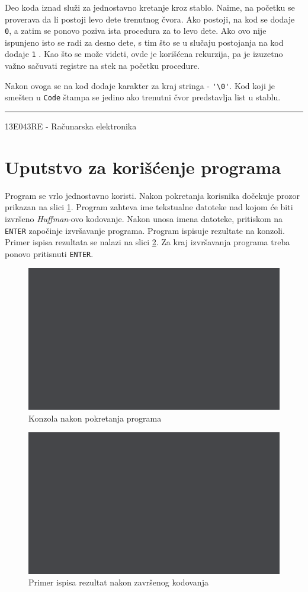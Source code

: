 \documentclass[a4paper, 12pt]{article}
\newcommand{\btmline}{
\vfill
\rule{0.9\textwidth}{0.4mm}
\begin{center}
13E043RE - Računarska elektronika
\end{center}}
\begin{document}
Deo koda iznad služi za jednostavno kretanje kroz stablo. Naime, na početku se proverava da li postoji levo dete trenutnog čvora. Ako postoji, na kod se dodaje \verb|0|, a zatim se ponovo poziva ista procedura za to levo dete. Ako ovo nije ispunjeno isto se radi za desno dete, s tim što se u slučaju postojanja na kod dodaje \verb|1| . Kao što se može videti, ovde je korišćena rekurzija, pa je izuzetno važno sačuvati registre na stek na početku procedure.

\vspace{2cm}

Nakon ovoga se na kod dodaje karakter za kraj stringa - \verb|'\0'|. Kod koji je smešten u \verb|Code| štampa se jedino ako trenutni čvor predstavlja list u stablu.

\btmline\newpage

\section*{Uputstvo za korišćenje programa}

Program se vrlo jednostavno koristi. Nakon pokretanja korisnika dočekuje prozor prikazan na slici \ref{startup}. Program zahteva ime tekstualne datoteke nad kojom će biti izvršeno \textit{Huffman}-ovo kodovanje. Nakon unosa imena datoteke, pritiskom na \verb|ENTER| započinje izvršavanje programa. Program ispisuje rezultate na konzoli. Primer ispisa rezultata se nalazi na slici \ref{done}. Za kraj izvršavanja programa treba ponovo pritisnuti \verb|ENTER|.

\begin{figure}[h!]
\centering
\includegraphics[width=.5\textwidth]{blank}
\caption{Konzola nakon pokretanja programa}
\label{startup}
\end{figure}

\begin{figure}[h!]
\centering
\includegraphics[width=.5\textwidth]{blank}
\caption{Primer ispisa rezultat nakon završenog kodovanja}
\label{done}
\end{figure}
\end{document}
